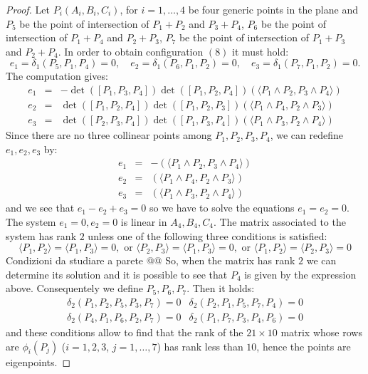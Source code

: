 \documentclass{amsart}
\theoremstyle{plain}
\theoremstyle{definition}
\newcommand{\scl}[2]{\langle #1, #2 \rangle}
\begin{document}
\begin{proof}
Let $P_i(A_i, B_i, C_i)$, for $i=1, \dots, 4$
be four generic points in the plane and $P_5$
be the point of intersection of $P_1+P_2$ and $P_3+P_4$,
$P_6$ be the point of intersection of $P_1+P_4$ and $P_2+P_3$,
$P_7$ be the point of intersection of $P_1+P_3$ and $P_2+P_4$.
In order to obtain configuration $(8)$ it must hold:
\[
e_1 = \delta_1(P_5, P_1, P_4) = 0, \quad
e_2 = \delta_1(P_6, P_1, P_2) = 0, \quad
e_3 = \delta_1(P_7, P_1, P_2) = 0.
\]
The computation gives:
\[
\begin{array}{rcl}
e_1 & =& -\det([P_1, P_3, P_4]) \det([P_1, P_2, P_4])
\left(\scl{P_1\wedge P_2}{P_3 \wedge P_4} \right)\\
e_2 & =& \det([P_1, P_2, P_4]) \det([P_1, P_2, P_3])
\left(\scl{P_1\wedge P_4}{P_2 \wedge P_3} \right)\\
e_3 & =& \det([P_2, P_3, P_4]) \det([P_1, P_3, P_4])
\left(\scl{P_1\wedge P_3}{P_2 \wedge P_4} \right)
\end{array}
\]
Since there are no three collinear points among $P_1, P_2, P_3, P_4$,
we can redefine $e_1, e_2, e_3$ by:
\[
\begin{array}{rcl}
  e_1 & = & -\left(\scl{P_1\wedge P_2}{P_3 \wedge P_4} \right)\\
  e_2 & = & \left(\scl{P_1\wedge P_4}{P_2 \wedge P_3} \right)\\
  e_3 & = & \left(\scl{P_1\wedge P_3}{P_2 \wedge P_4} \right)
\end{array}
\]
and we see that $e_1-e_2+e_3 = 0$ so we have to solve the equations
$e_1=e_2=0$.
The system $e_1 = 0, e_2 = 0$ is linear in $A_4, B_4, C_4$. The 
matrix associated to the system has rank $2$ unless one of the following
three conditions is satisfied:
\[
\scl{P_1}{P_2} = \scl{P_1}{P_3} = 0, \mbox{ or }
\scl{P_2}{P_3} = \scl{P_1}{P_3} = 0, \mbox{ or }
\scl{P_1}{P_2} = \scl{P_2}{P_3} = 0
\]
Condizioni da studiare a parete @@
So, when the matrix has rank $2$ we can determine its solution
and it is possible to see that $P_4$ is given by the expression above.
Consequentely we define $P_5, P_6, P_7$. Then it holds:
\[
\begin{array}{ll}
  \delta_2(P_1, P_2, P_5, P_3, P_7) = 0 & 
\delta_2(P_2, P_1, P_5, P_7, P_4) = 0 \\
\delta_2(P_4, P_1, P_6, P_2, P_7) = 0 & 
\delta_2(P_1, P_7, P_3, P_4, P_6) = 0
\end{array}
\]
and these conditions allow to find that the rank of the $21\times 10$
matrix whose rows are $\phi_i(P_j)$ ($i = 1, 2, 3$, $j = 1, \dots, 7$)
has rank less than $10$, hence the points are eigenpoints. 
\end{proof}
\end{document}
